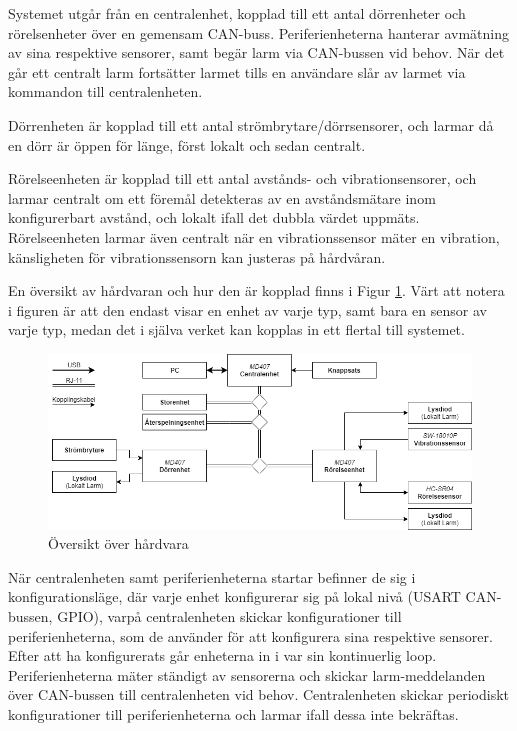 \documentclass{article}
\begin{document}
Systemet utgår från en centralenhet, kopplad till ett antal dörrenheter och rörelsenheter över en gemensam CAN-buss. Periferienheterna hanterar avmätning av sina respektive sensorer, samt begär larm via CAN-bussen vid behov. När det går ett centralt larm fortsätter larmet tills en användare slår av larmet via kommandon till centralenheten.

Dörrenheten är kopplad till ett antal strömbrytare/dörrsensorer, och larmar då en dörr är öppen för länge, först lokalt och sedan centralt.

Rörelseenheten är kopplad till ett antal avstånds- och vibrationsensorer, och larmar centralt om ett föremål detekteras av en avståndsmätare inom konfigurerbart avstånd, och lokalt ifall det dubbla värdet uppmäts.
Rörelseenheten larmar även centralt när en vibrationssensor mäter en vibration, känsligheten för vibrationssensorn kan justeras på hårdvåran.

En översikt av hårdvaran och hur den är kopplad finns i Figur \ref{fig:hårdvara}. Värt att notera i figuren är att den endast visar en enhet av varje typ, samt bara en sensor av varje typ, medan det i själva verket kan kopplas in ett flertal till systemet.
\begin{figure}[H] %
    \centering
    \includegraphics[width=1\textwidth]{figurer/HardvaraOversikt.png}
    \caption{Översikt över hårdvara}
    \label{fig:hårdvara}
\end{figure}

När centralenheten samt periferienheterna startar befinner de sig i konfigurationsläge, där varje enhet konfigurerar sig på lokal nivå (USART CAN-bussen, GPIO), varpå centralenheten skickar konfigurationer till periferienheterna, som de använder för att konfigurera sina respektive sensorer.
Efter att ha konfigurerats går enheterna in i var sin kontinuerlig loop. Periferienheterna mäter ständigt av sensorerna och skickar larm-meddelanden över CAN-bussen till centralenheten vid behov. Centralenheten skickar periodiskt konfigurationer till periferienheterna och larmar ifall dessa inte bekräftas.
\end{document}
